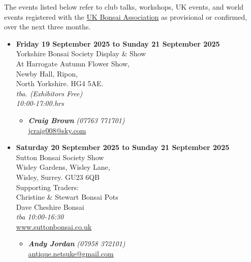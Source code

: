 \label{2025-09-events}
\noindent
The events listed below refer to club talks, workshops, UK events, and world events registered with the \href{https://www.ukbonsaiassoc.org/events.html}{UK Bonsai Association} as provisional or confirmed, over the next three months.

\begin{itemize}
    \item \textbf{Friday 19 September 2025 to Sunday 21 September 2025}
    \\
    Yorkshire Bonsai Society Display \& Show \\
    At Harrogate Autumn Flower Show, \\
    Newby Hall, Ripon, \\
    North Yorkshire. HG4 5AE.
    \\
    \emph{tba. (Exhibitors Free)} \\
    \emph{10:00-17:00.hrs}
    \begin{itemize}
        \item \textbf{\emph{Craig Brown}} \emph{(07763 771701)} \\
        \href{mailto:jcraig008@sky.com}{jcraig008@sky.com} 
    \end{itemize}

    \item \textbf{Saturday 20 September 2025 to Sunday 21 September 2025}
    \\
    Sutton Bonsai Society Show \\
    Wisley Gardens, Wisley Lane, \\
    Wisley, Surrey. GU23 6QB \\
    Supporting Traders: \\
    Christine \& Stewart Bonsai Pots \\
    Dave Cheshire Bonsai
    \\
    \emph{tba 10:00-16:30}
    \\
    \href{https://www.suttonbonsai.co.uk}{www.suttonbonsai.co.uk}
    \begin{itemize}
        \item \textbf{\emph{Andy Jordan}} \emph{(07958 372101)} \\
        \href{mailto:antique.netsuke@gmail.com}{antique.netsuke@gmail.com} 
    \end{itemize}


\end{itemize}
